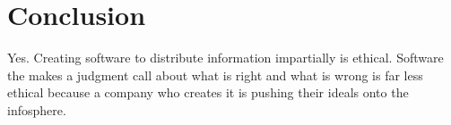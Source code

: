 \documentclass[11pt]{article}
\begin{document}
\section{Conclusion}
Yes. Creating software to distribute information impartially is ethical. Software the makes a judgment call about what is right and what is wrong is far less ethical because a company who creates it is pushing their ideals onto the infosphere.

\newpage
\singlespacing


\end{document}
